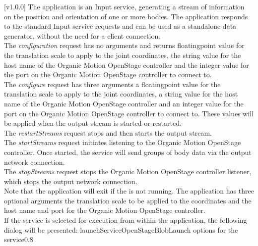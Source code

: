 [v1.0.0]
The  application is an Input service,
generating a stream of information on the position and orientation of one or more bodies.
The application responds to the standard Input service requests and can be used as a
standalone data generator, without the need for a client connection.\\

The \emph{configuration} request has no arguments and returns floating\longDash{}point
value for the translation scale to apply to the joint coordinates, the string value for
the host name of the Organic Motion OpenStage controller and the integer value for the
port on the Organic Motion OpenStage controller to connect to.\\

The \emph{configure} request has three arguments \longDash{} a floating\longDash{}point
value for the translation scale to apply to the joint coordinates, a string value for
the host name of the Organic Motion OpenStage controller and an integer value for the port
on the Organic Motion OpenStage controller to connect to.
These values will be applied when the output stream is started or restarted.\\ 

The \emph{restartStreams} request stops and then starts the output stream.\\

The \emph{startStreams} request initiates listening to the Organic Motion
OpenStage controller.
Once started, the service will send groups of body data via the output \yarp{} network
connection.\\

The \emph{stopStreams} request stops the Organic Motion OpenStage controller listener,
which stops the output \yarp{} network connection.\\ 

Note that the application will exit if the \emph{\RS} is not running.
The application has three optional arguments \longDash{} the translation scale to be
applied to the coordinates and the host name and port for the Organic Motion OpenStage
controller.
\insertAppParameters
\insertTagDescription{\OSBI}
\insertInputServiceComment\\

\insertStandardServiceCommands
\secondaryEnd
\condPage
{}
If the service is selected for execution from within the \emph{\MMMU} application, the
following dialog will be presented:
%
{launchServiceOpenStageBlob}{Launch options for the \emph{\OSBI} service}{0.8}

